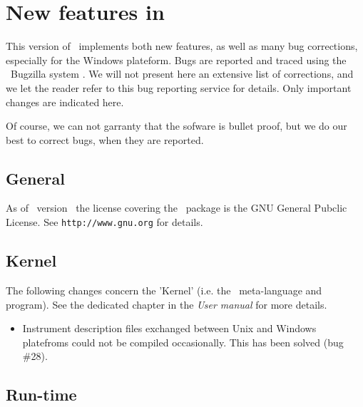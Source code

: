
\chapter{New features in \MCS\ \version\ }
\label{c:changes}

This version of \MCS\ implements both new features, as well as many bug corrections, especially for the Windows plateform. Bugs are reported and traced using the \MCS\ Bugzilla system \cite{mczilla_webpage}. We will not present here an extensive list of corrections, and we let the reader refer to this bug reporting service for details. Only important changes are indicated here.

Of course, we can not garranty that the sofware is bullet proof, but we do our best to correct bugs, when they are reported.

\section{General}
\label{s:new-features:general}
As of \MCS\ version \version\, the license covering the \MCS\ package
is the GNU General Pubclic License. See \verb+http://www.gnu.org+ for details.

\section{Kernel}
\label{s:new-features:kernel}

The following changes concern the 'Kernel' (i.e. the \MCS\ meta-language and program). See the dedicated chapter in the {\it User manual} for more details.

\begin{itemize}
\item Instrument description files exchanged between Unix and Windows platefroms could not be compiled occasionally. This has been solved (bug \#28).
\end{itemize}

\section{Run-time}
\label{s:new-features:run-time}

